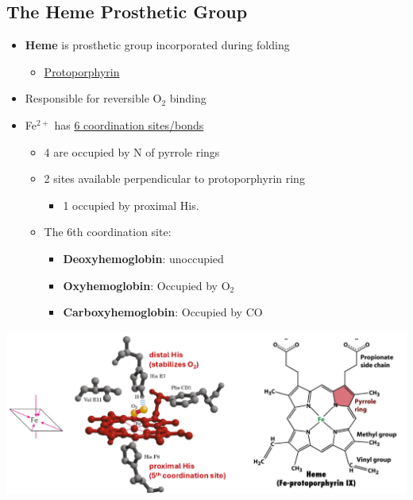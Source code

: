 \documentclass[10pt]{article}
\begin{document}
\subsection*{The Heme Prosthetic Group}
\begin{itemize}
    \item \textbf{Heme} is prosthetic group incorporated during folding
    \begin{itemize}
        \item \underline{Protoporphyrin}
    \end{itemize}
    \item Responsible for reversible O$_2$ binding
    \item Fe$^{2+}$ has \underline{6 coordination sites/bonds}
    \begin{itemize}
        \item 4 are occupied by N of pyrrole rings
        \item 2 sites available perpendicular to protoporphyrin ring
        \begin{itemize}
            \item 1 occupied by proximal His.
        \end{itemize}
        \item The 6th coordination site:
        \begin{itemize}
            \item \textbf{Deoxyhemoglobin}: unoccupied
            \item \textbf{Oxyhemoglobin}: Occupied by O$_2$
            \item \textbf{Carboxyhemoglobin}: Occupied by CO
        \end{itemize}
    \end{itemize}
\end{itemize}
\begin{center}
    \includegraphics*[width=\textwidth]{L2_2.png}
\end{center}
\end{document}
